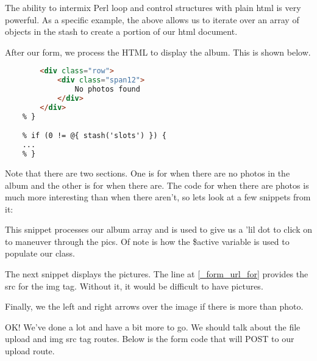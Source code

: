 \documentclass[14pt]{extreport}
\begin{document}


The ability to intermix Perl loop and control structures with plain html is
very powerful. As a specific example, the above allows us to iterate over an 
array of objects in the stash to create a portion of our html document.

After our form, we process the HTML to display the album.  This is shown below.

\begin{lstlisting}[caption={Display album - templates/album/show.html.ep}, language=Html]
    % if (0 == @{ stash('slots') }) {
        <div class="row">
            <div class="span12">
                No photos found
            </div>
        </div>
    % }

    % if (0 != @{ stash('slots') }) {
    ...
    % }
\end{lstlisting}

Note that there are two sections.  One is for when there are no photos in the
album and the other is for when there are.  The code for when there are photos
is much more interesting than when there aren't, so lets look at a few snippets
from it:

This snippet processes our album array and is used to give us a 'lil dot to
click on to maneuver through the pics.  Of note is how the \$active variable is
used to populate our class.



The next snippet displays the pictures. The line at \ref{_form_url_for} provides the 
src for the img tag. Without it, it would be difficult to have pictures.



Finally, we the left and right arrows over the image if there is more than photo.



OK!  We've done a lot and have a bit more to go.  We should talk about the file upload
and img src tag routes.  Below is the form code that will POST to our upload route.
\end{document}
